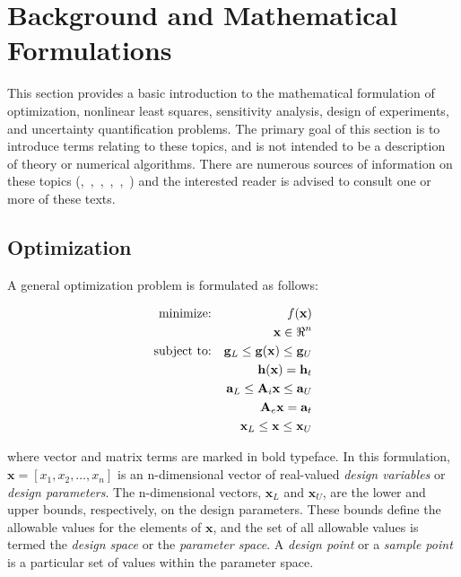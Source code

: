 \section{Background and Mathematical Formulations}\label{introduction:background}

This section provides a basic introduction to the mathematical
formulation of optimization, nonlinear least squares, sensitivity
analysis, design of experiments, and uncertainty quantification
problems. The primary goal of this section is to introduce terms
relating to these topics, and is not intended to be a description of
theory or numerical algorithms. There are numerous sources of
information on these topics
(\cite{Aro89},~\cite{Gil81},~\cite{Haf92},~\cite{Hal00},~\cite{Noc99},~\cite{Van84}) and
the interested reader is advised to consult one or more of these
texts.

\subsection{Optimization}\label{introduction:background:optimization}

A general optimization problem is formulated as follows:

\begin{eqnarray}
  \hbox{minimize:} & & f(\mathbf{x})\nonumber\\
  & & \mathbf{x} \in \Re^{n}\nonumber\\
  \hbox{subject to:} & &
  \mathbf{g}_{L} \leq \mathbf{g(x)} \leq \mathbf{g}_U\nonumber\\
  & & \mathbf{h(x)}=\mathbf{h}_{t}\label{introduction:equation01}\\
  & & \mathbf{a}_{L} \leq \mathbf{A}_i\mathbf{x} \leq
  \mathbf{a}_U\nonumber\\
  & & \mathbf{A}_{e}\mathbf{x}=\mathbf{a}_{t}\nonumber\\
  & & \mathbf{x}_{L} \leq \mathbf{x} \leq \mathbf{x}_U\nonumber
\end{eqnarray}

where vector and matrix terms are marked in bold typeface. In this
formulation, $\mathbf{x}=[x_{1},x_{2},\ldots,x_{n}]$ is an
n-dimensional vector of real-valued \emph{design variables} or
\emph{design parameters}. The n-dimensional vectors, $\mathbf{x}_{L}$
and $\mathbf{x}_U$, are the lower and upper bounds, respectively, on
the design parameters. These bounds define the allowable values for
the elements of $\mathbf{x}$, and the set of all allowable values is
termed the \emph{design space} or the \emph{parameter space}. A
\emph{design point} or a \emph{sample point} is a particular set of 
values within the parameter space.

